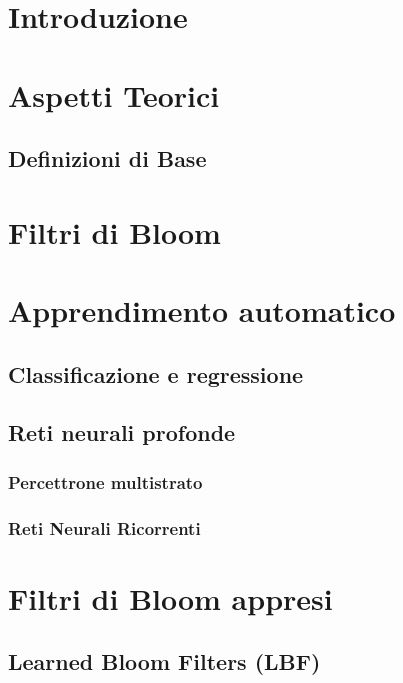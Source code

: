 \documentclass{report}
\begin{document}
\tableofcontents

\chapter{Introduzione}

\chapter{Aspetti Teorici}
\section{Definizioni di Base}

\chapter{Filtri di Bloom}

\chapter{Apprendimento automatico}

\section{Classificazione e regressione}

\section{Reti neurali profonde} %

\subsection{Percettrone multistrato}
\subsection{Reti Neurali Ricorrenti}

\chapter{Filtri di Bloom appresi}
    \section{Learned Bloom Filters (LBF)}
\end{document}
